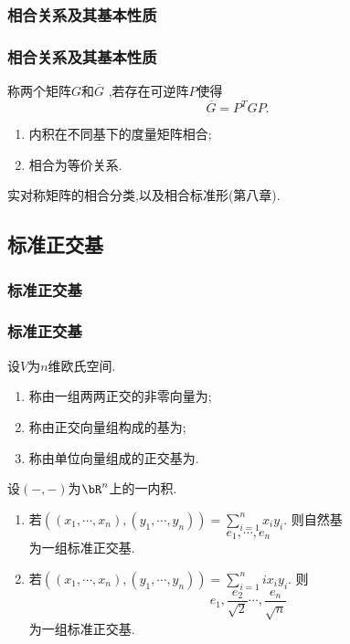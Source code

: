 \subsubsection{相合关系及其基本性质}
\begin{frame}\frametitle{相合关系及其基本性质}
\begin{definition}[相合]
称两个矩阵$G$和$\overline{G}$ ,若存在可逆阵$P$使得
\[\overline{G}=P^TGP.\]
\end{definition}
\pp
\begin{proposition}
\begin{enumerate}
\item 内积在不同基下的度量矩阵相合;
\pp
\item 相合为等价关系.
\end{enumerate}
\end{proposition}
\pp
实对称矩阵的相合分类,以及相合标准形(第八章).

\end{frame}




\subsection{标准正交基}


\subsubsection{标准正交基}
\begin{frame}\frametitle{标准正交基}

\pp
\begin{definition}[标准正交基]
设$V$为$n$维欧氏空间.
\begin{enumerate}
\item 称由一组两两正交的非零向量为;
\pp
\item 称由正交向量组构成的基为;
\pp
\item 称由单位向量组成的正交基为.
\end{enumerate}
\end{definition}
\pp
\begin{example}设$(-,-)$为$\bR^n$上的一内积.
\pp
\begin{enumerate}
\item 若$((x_1,\cdots,x_n),(y_1,\cdots,y_n))=\sum_{i=1}^nx_iy_i$.
\pp
则自然基
\[e_1,\cdots,e_n\]
为一组标准正交基.
\pp
\item 若$((x_1,\cdots,x_n),(y_1,\cdots,y_n))=\sum_{i=1}^nix_iy_i$.
\pp
则
\[e_1,\frac{e_2}{\sqrt{2}}\cdots,\frac{e_n}{\sqrt{n}}\]
为一组标准正交基.
\end{enumerate}
\end{example}
\end{frame}









